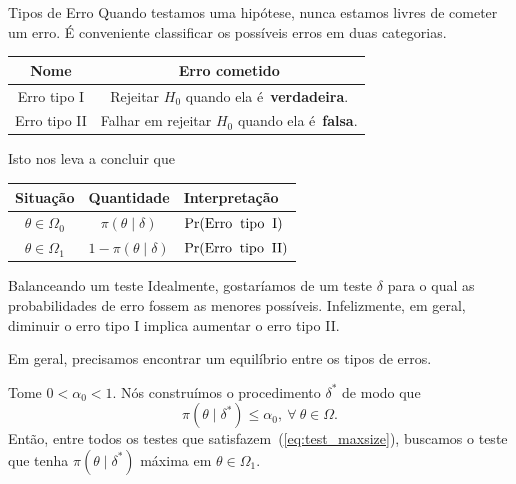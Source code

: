 \begin{frame}{Tipos de Erro}
 Quando testamos uma hipótese, nunca estamos livres de cometer um erro.
 É conveniente classificar os possíveis erros em duas categorias.
 \begin{defn}
 \begin{center}
  \begin{tabular}{cc}
   Nome & Erro cometido\\
   \hline
   Erro tipo I & Rejeitar $H_0$ quando ela é~\textbf{verdadeira}.\\
   Erro tipo II & Falhar em rejeitar $H_0$ quando ela é~\textbf{falsa}.\\
   \hline
  \end{tabular}
 \end{center}  
 \end{defn}
Isto nos leva a concluir que
\begin{center}
  \begin{tabular}{ccl}
   Situação & Quantidade & Interpretação\\
   \hline
    $\theta \in \Omega_0$ & $\pi(\theta \mid \delta)$ & $\operatorname{Pr}(\text{Erro\: tipo\: I})$ \\
    $\theta \in \Omega_1$ & $1-\pi(\theta \mid \delta)$& $\operatorname{Pr}(\text{Erro\: tipo\: II})$\\
   \hline
  \end{tabular}
\end{center} 
 \end{frame}

\begin{frame}{Balanceando um teste}
 Idealmente, gostaríamos de um teste $\delta$ para o qual as probabilidades de erro fossem as menores possíveis. 
 Infelizmente, em geral, diminuir o erro tipo I implica aumentar o erro tipo II. 

 Em geral, precisamos encontrar um equilíbrio entre os tipos de erros.
 \begin{ideia}
  Tome $0 < \alpha_0 < 1$.
  Nós construímos o procedimento $\delta^\ast$ de modo que
  \begin{equation}
  \label{eq:test_maxsize}
   \pi(\theta \mid \delta^\ast) \leq \alpha_0, \: \forall\: \theta \in \Omega.
  \end{equation}
 Então, entre todos os testes que satisfazem~(\ref{eq:test_maxsize}), buscamos o teste que tenha $\pi(\theta \mid \delta^\ast)$ máxima em $\theta \in \Omega_1$.
 \end{ideia}
\end{frame}
 
